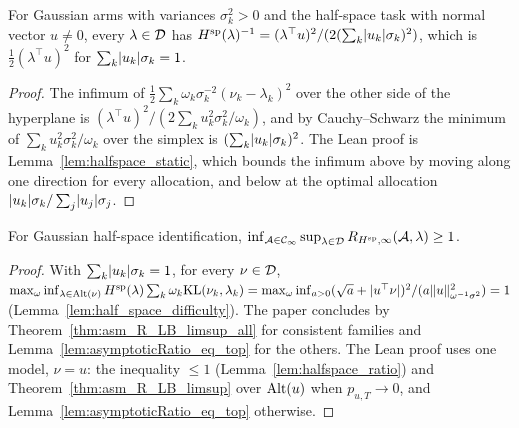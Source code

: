 \begin{lemma}[{\cite[Lemma 15]{D23}}]
  \label{lem:half_space_difficulty}
  \leanok
  For Gaussian arms with variances $\sigma_k^2 > 0$ and the half-space task with normal vector
  $u \ne 0$, every $\lambda \in \mathcal{D}$ has
  $H^{\mathrm{sp}}(\lambda)^{-1} = (\lambda^{\top} u)^2 / (2 (\sum_k \lvert u_k \rvert \sigma_k)^2)$, which is
  $\frac12 (\lambda^{\top} u)^2$ for $\sum_k \lvert u_k \rvert \sigma_k = 1$.
\end{lemma}

\begin{proof}
  \leanok
  The infimum of $\frac12 \sum_k \omega_k \sigma_k^{-2} (\nu_k - \lambda_k)^2$ over the other side
  of the hyperplane is $(\lambda^{\top} u)^2 / (2 \sum_k u_k^2 \sigma_k^2 / \omega_k)$, and by
  Cauchy--Schwarz the minimum of $\sum_k u_k^2 \sigma_k^2 / \omega_k$ over the simplex is
  $(\sum_k \lvert u_k \rvert \sigma_k)^2$. The Lean proof is Lemma~\ref{lem:halfspace_static}, which
  bounds the infimum above by moving along one direction for every allocation, and below at the
  optimal allocation $\lvert u_k \rvert \sigma_k / \sum_j \lvert u_j \rvert \sigma_j$.
\end{proof}

\begin{lemma}[{\cite[Lemma 16]{D23}}]
  \label{lem:half_space}
  \leanok
  For Gaussian half-space identification,
  $\inf_{\mathcal{A} \in \mathcal{C}_{\infty}} \sup_{\lambda \in \mathcal{D}} R_{H^{\mathrm{sp}}, \infty}(\mathcal{A}, \lambda) \ge 1$.
\end{lemma}

\begin{proof}
  \leanok
  With $\sum_k \lvert u_k \rvert \sigma_k = 1$, for every $\nu \in \mathcal{D}$,
  $\max_{\omega} \inf_{\lambda \in \mathrm{Alt}(\nu)} H^{\mathrm{sp}}(\lambda) \sum_k \omega_k \mathrm{KL}(\nu_k, \lambda_k) =
  \max_{\omega} \inf_{a > 0} (\sqrt a + \lvert u^{\top} \nu \rvert)^2 / (a \lVert u \rVert^2_{\omega^{-1} \sigma^2})
  = 1$ (Lemma~\ref{lem:half_space_difficulty}). The paper concludes by
  Theorem~\ref{thm:asm_R_LB_limsup_all} for consistent families and
  Lemma~\ref{lem:asymptoticRatio_eq_top} for the others. The Lean proof uses one model, $\nu = u$:
  the inequality $\le 1$ (Lemma~\ref{lem:halfspace_ratio}) and Theorem~\ref{thm:asm_R_LB_limsup}
  over $\mathrm{Alt}(u)$ when $p_{u, T} \to 0$, and Lemma~\ref{lem:asymptoticRatio_eq_top} otherwise.
\end{proof}

